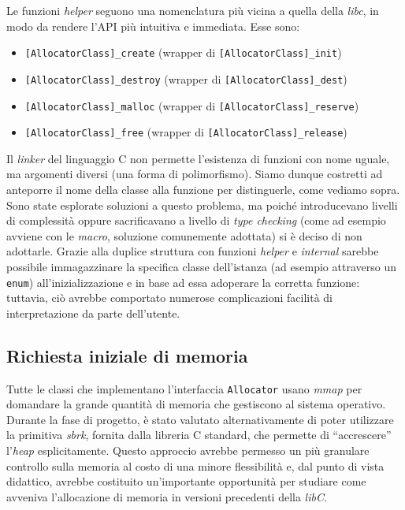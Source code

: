Le funzioni \textit{helper} seguono una nomenclatura più vicina a quella della \textit{libc}, in modo da rendere l’API più intuitiva e immediata. Esse sono:
\begin{itemize}
    \item \texttt{[AllocatorClass]\_create} (wrapper di \texttt{[AllocatorClass]\_init})
    \item \texttt{[AllocatorClass]\_destroy} (wrapper di \texttt{[AllocatorClass]\_dest})
    \item \texttt{[AllocatorClass]\_malloc} (wrapper di \texttt{[AllocatorClass]\_reserve})
    \item \texttt{[AllocatorClass]\_free} (wrapper di \texttt{[AllocatorClass]\_release})
\end{itemize}
Il \textit{linker} del linguaggio C non permette l'esistenza di funzioni con nome uguale, ma argomenti diversi (una forma di polimorfismo). Siamo dunque costretti ad anteporre il nome della classe alla funzione per distinguerle, come vediamo sopra. Sono state esplorate soluzioni a questo problema, ma poiché introducevano livelli di complessità oppure sacrificavano a livello di \textit{type checking} (come ad esempio avviene con le \textit{macro}, soluzione comunemente adottata) si è deciso di non adottarle. Grazie alla duplice struttura con funzioni \textit{helper} e \textit{internal} sarebbe possibile immagazzinare la specifica classe dell'istanza (ad esempio attraverso un \texttt{enum}) all'inizializzazione e in base ad essa adoperare la corretta funzione: tuttavia, ciò avrebbe comportato numerose complicazioni facilità di interpretazione da parte dell'utente.

\subsection{Richiesta iniziale di memoria}
Tutte le classi che implementano l’interfaccia \texttt{Allocator} usano \textit{mmap} per domandare la grande quantità di memoria che gestiscono al sistema operativo. Durante la fase di progetto, è stato valutato alternativamente di poter utilizzare la primitiva \textit{sbrk}, fornita dalla libreria C standard, che permette di “accrescere” l’\textit{heap} esplicitamente. Questo approccio avrebbe permesso un più granulare controllo sulla memoria al costo di una minore flessibilità e, dal punto di vista didattico, avrebbe costituito un'importante opportunità per studiare come avveniva l’allocazione di memoria in versioni precedenti della \textit{libC}.

